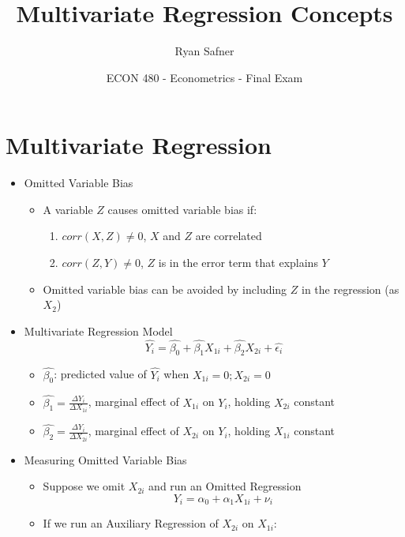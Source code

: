 \documentclass{article}
\title{Multivariate Regression Concepts}
\author{Ryan Safner}
\date{ECON 480 - Econometrics - Final Exam}
\begin{document}
	
\maketitle

\section*{Multivariate Regression}

\begin{itemize}
	\item Omitted Variable Bias 
	\begin{itemize}
		\item A variable $Z$ causes omitted variable bias if: 
		\begin{enumerate}
			\item $corr(X,Z) \neq 0$, $X$ and $Z$ are correlated
			\item $corr(Z, Y) \neq 0$, $Z$ is in the error term that explains $Y$	
		\end{enumerate}
		\item Omitted variable bias can be avoided by including $Z$ in the regression (as $X_2$) 
	\end{itemize}	
	\item Multivariate Regression Model
	\begin{equation*}
	\widehat{Y_i}=\hat{\beta_0}+\hat{\beta_1}X_{1i}+\hat{\beta_2}X_{2i}+\hat{\epsilon_i}	
	\end{equation*}
	\begin{itemize}
		\item $\hat{\beta_0}$: predicted value of $\hat{Y_i}$ when $X_{1i}=0; X_{2i}=0$
		\item $\hat{\beta_1}=\displaystyle\frac{\Delta Y_i}{\Delta X_{1i}}$, marginal effect of $X_{1i}$ on $Y_i$, holding $X_{2i}$ constant
		\item $\hat{\beta_2}=\displaystyle\frac{\Delta Y_i}{\Delta X_{2i}}$, marginal effect of $X_{2i}$ on $Y_i$, holding $X_{1i}$ constant
	\end{itemize} 
	\item Measuring Omitted Variable Bias
	\begin{itemize}
		\item Suppose we omit $X_{2i}$ and run an Omitted Regression
		\begin{equation*}
	Y_i=\alpha_0+\alpha_1X_{1i}+\nu_{i}	
		\end{equation*}
		\item If we run an Auxiliary Regression of $X_{2i}$ on $X_{1i}$:

\end{itemize}
\end{itemize}
\end{document}

